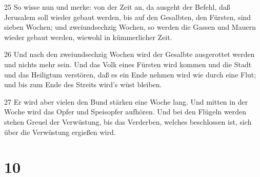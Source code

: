 \par 25 So wisse nun und merke: von der Zeit an, da ausgeht der Befehl, daß Jerusalem soll wieder gebaut werden, bis auf den Gesalbten, den Fürsten, sind sieben Wochen; und zweiundsechzig Wochen, so werden die Gassen und Mauern wieder gebaut werden, wiewohl in kümmerlicher Zeit.
\par 26 Und nach den zweiundsechzig Wochen wird der Gesalbte ausgerottet werden und nichts mehr sein. Und das Volk eines Fürsten wird kommen und die Stadt und das Heiligtum verstören, daß es ein Ende nehmen wird wie durch eine Flut; und bis zum Ende des Streits wird's wüst bleiben.
\par 27 Er wird aber vielen den Bund stärken eine Woche lang. Und mitten in der Woche wird das Opfer und Speisopfer aufhören. Und bei den Flügeln werden stehen Greuel der Verwüstung, bis das Verderben, welches beschlossen ist, sich über die Verwüstung ergießen wird.

\chapter{10}

